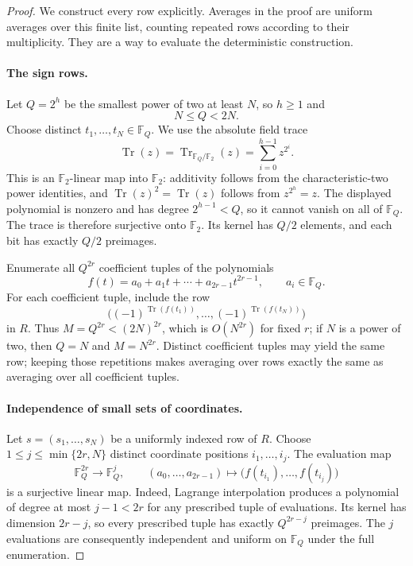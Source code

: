 \documentclass[10pt,a4paper]{amsart}
\newcommand{\F}{\mathbb F}
\DeclareMathOperator{\Tr}{Tr}
\begin{document}
\begin{proof}
We construct every row explicitly. Averages in the proof are uniform averages over this finite list, counting repeated rows according to their multiplicity. They are a way to evaluate the deterministic construction.

\paragraph{The sign rows.}
Let $Q=2^h$ be the smallest power of two at least $N$, so $h\ge1$ and
\[
 N\le Q<2N.
\]
Choose distinct $t_1,\ldots,t_N\in\F_Q$. We use the absolute field trace
\[
 \Tr(z)=\Tr_{\F_Q/\F_2}(z)
       =\sum_{i=0}^{h-1}z^{2^i}.
\]
This is an $\F_2$-linear map into $\F_2$: additivity follows from the characteristic-two power identities, and $\Tr(z)^2=\Tr(z)$ follows from $z^{2^h}=z$. The displayed polynomial is nonzero and has degree $2^{h-1}<Q$, so it cannot vanish on all of $\F_Q$. The trace is therefore surjective onto $\F_2$. Its kernel has $Q/2$ elements, and each bit has exactly $Q/2$ preimages.

Enumerate all $Q^{2r}$ coefficient tuples of the polynomials
\[
 f(t)=a_0+a_1t+\cdots+a_{2r-1}t^{2r-1},
 \qquad a_i\in\F_Q.
\]
For each coefficient tuple, include the row
\begin{equation}\label{eq:sign-row}
 \bigl((-1)^{\Tr(f(t_1))},\ldots,(-1)^{\Tr(f(t_N))}\bigr)
\end{equation}
in $R$. Thus $M=Q^{2r}<(2N)^{2r}$, which is $O(N^{2r})$ for fixed $r$; if $N$ is a power of two, then $Q=N$ and $M=N^{2r}$. Distinct coefficient tuples may yield the same row; keeping those repetitions makes averaging over rows exactly the same as averaging over all coefficient tuples.

\paragraph{Independence of small sets of coordinates.}
Let $s=(s_1,\ldots,s_N)$ be a uniformly indexed row of $R$. Choose $1\le j\le\min\{2r,N\}$ distinct coordinate positions $i_1,\ldots,i_j$. The evaluation map
\[
 \F_Q^{2r}\longrightarrow\F_Q^j,
 \qquad(a_0,\ldots,a_{2r-1})
 \longmapsto\bigl(f(t_{i_1}),\ldots,f(t_{i_j})\bigr)
\]
is a surjective linear map. Indeed, Lagrange interpolation produces a polynomial of degree at most $j-1<2r$ for any prescribed tuple of evaluations. Its kernel has dimension $2r-j$, so every prescribed tuple has exactly $Q^{2r-j}$ preimages. The $j$ evaluations are consequently independent and uniform on $\F_Q$ under the full enumeration.


\end{proof}
\end{document}
